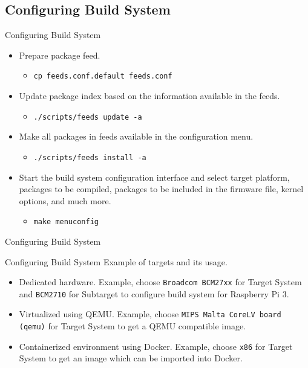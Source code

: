 \subsection{Configuring Build System}
\begin{frame}{Configuring Build System}
    \pause
    \begin{itemize}[<+-|alert@+>]
        \item Prepare package feed.
        \begin{itemize}
            \item \texttt{cp feeds.conf.default feeds.conf}
        \end{itemize}
        \item Update package index based on the information available in the feeds.
        \begin{itemize}
            \item \texttt{./scripts/feeds update -a}
        \end{itemize}
        \item Make all packages in feeds available in the configuration menu.
        \begin{itemize}
            \item \texttt{./scripts/feeds install -a}
        \end{itemize}
        \item Start the build system configuration interface and select target platform, packages to be compiled, packages to be included in the firmware file, kernel options, and much more.
        \begin{itemize}
            \item \texttt{make menuconfig}
        \end{itemize}
    \end{itemize}
\end{frame}

\begin{frame}{Configuring Build System}
\end{frame}

\begin{frame}{Configuring Build System}
    Example of targets and its usage.
    \pause
    \begin{itemize}[<+-|alert@+>]
        \item Dedicated hardware. Example, choose \texttt{Broadcom BCM27xx} for Target System and \texttt{BCM2710} for Subtarget to configure build system for Raspberry Pi 3.
        \item Virtualized using QEMU. Example, choose \texttt{MIPS Malta CoreLV board (qemu)} for Target System to get a QEMU compatible image.
        \item Containerized environment using Docker. Example, choose \texttt{x86} for Target System to get an image which can be imported into Docker.
    \end{itemize}
\end{frame}

